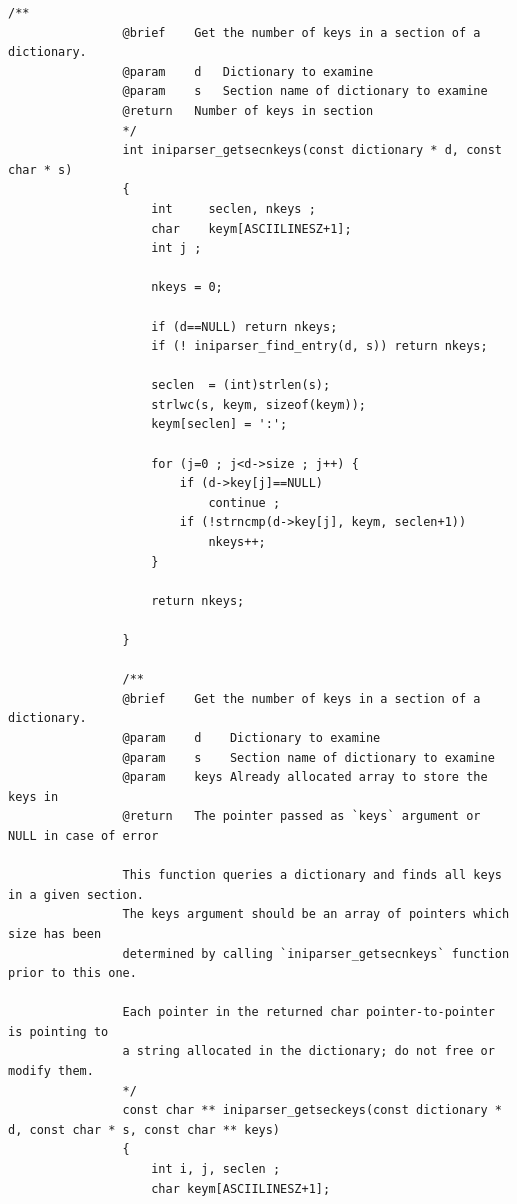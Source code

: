 \documentclass{article}
\begin{document}
\begin{Verbatim}[gobble=8]
                /**
                @brief    Get the number of keys in a section of a dictionary.
                @param    d   Dictionary to examine
                @param    s   Section name of dictionary to examine
                @return   Number of keys in section
                */
                int iniparser_getsecnkeys(const dictionary * d, const char * s)
                {
                    int     seclen, nkeys ;
                    char    keym[ASCIILINESZ+1];
                    int j ;
                
                    nkeys = 0;
                
                    if (d==NULL) return nkeys;
                    if (! iniparser_find_entry(d, s)) return nkeys;
                
                    seclen  = (int)strlen(s);
                    strlwc(s, keym, sizeof(keym));
                    keym[seclen] = ':';
                
                    for (j=0 ; j<d->size ; j++) {
                        if (d->key[j]==NULL)
                            continue ;
                        if (!strncmp(d->key[j], keym, seclen+1))
                            nkeys++;
                    }
                
                    return nkeys;
                
                }
                
                /**
                @brief    Get the number of keys in a section of a dictionary.
                @param    d    Dictionary to examine
                @param    s    Section name of dictionary to examine
                @param    keys Already allocated array to store the keys in
                @return   The pointer passed as `keys` argument or NULL in case of error
                
                This function queries a dictionary and finds all keys in a given section.
                The keys argument should be an array of pointers which size has been
                determined by calling `iniparser_getsecnkeys` function prior to this one.
                
                Each pointer in the returned char pointer-to-pointer is pointing to
                a string allocated in the dictionary; do not free or modify them.
                */
                const char ** iniparser_getseckeys(const dictionary * d, const char * s, const char ** keys)
                {
                    int i, j, seclen ;
                    char keym[ASCIILINESZ+1];
                

\end{Verbatim}
\end{document}
